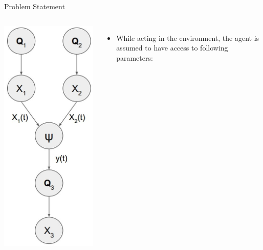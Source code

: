 \documentclass[
	english,%
	aspectratio=169,%
	color={accentcolor=3b},
	logo=true,%
	colorframetitle=false,%
	]{tudabeamer}
\begin{document}
\begin{frame}{Problem Statement}
\begin{columns}[onlytextwidth,c]
	\centering
	\includegraphics[width=0.75\linewidth]{figures/h_model}
	\begin{itemize}
		\item While acting in the environment, the agent is assumed to have access to following parameters:

\end{itemize}
\end{columns}
\end{frame}
\end{document}
